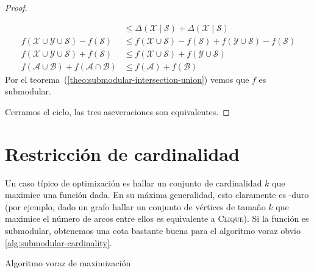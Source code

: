 \begin{proof}
\begin{description}
\begin{align*}
          &\le \Delta(\mathscr{X} \mid \mathscr{S})
                 + \Delta(\mathscr{X} \mid \mathscr{S}) \\
        f(\mathscr{X} \cup \mathscr{Y} \cup \mathscr{S})
          - f(\mathscr{S})
          &\le f(\mathscr{X} \cup \mathscr{S}) - f(\mathscr{S})
                 + f(\mathscr{Y} \cup \mathscr{S}) - f(\mathscr{S}) \\
        f(\mathscr{X} \cup \mathscr{Y} \cup \mathscr{S})
          + f(\mathscr{S})
          &\le f(\mathscr{X} \cup \mathscr{S})
                 + f(\mathscr{Y} \cup \mathscr{S}) \\
        f(\mathscr{A} \cup \mathscr{B}) + f(\mathscr{A} \cap \mathscr{B})
          &\le f(\mathscr{A}) + f(\mathscr{B})
      \end{align*}
      Por el teorema~(\ref{theo:submodular-intersection-union})
      vemos que \(f\) es submodular.
    \end{description}
    Cerramos el ciclo,
    las tres aseveraciones son equivalentes.
  \end{proof}

\section{Restricción de cardinalidad}
\label{sec:submocular-cardinality}

  Un caso típico de optimización es hallar un conjunto de cardinalidad \(k\)
  que maximice una función dada.
  En su máxima generalidad,
  esto claramente es \NP\nobreakdash-duro
  (por ejemplo,
   dado un grafo hallar un conjunto de vértices de tamaño \(k\)
   que maximice el número de arcos entre ellos
   es equivalente a \textsc{Clique}).
  Si la función es submodular,
  obtenemos una cota bastante buena para el algoritmo voraz obvio~%
    \ref{alg:submodular-cardinality}.

  \begin{algorithm}
    \DontPrintSemicolon\Indp

    \caption{Algoritmo voraz de maximización}
    \label{alg:submodular-cardinality}
  \end{algorithm}

